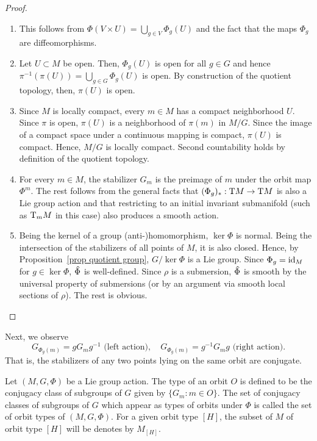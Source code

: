 \begin{proof}
    \begin{enumerate}
        \item This follows from $\Phi(V\times U)=\bigcup_{g\in V}\Phi_g(U)$ and the fact that the maps $\Phi_g$ are diffeomorphisms.
        \item Let $U\subset M$ be open. Then, $\Phi_g(U)$ is open for all $g\in G$ and hence $\pi^{-1}(\pi(U))=\bigcup_{g\in G}\Phi_g(U)$ is open. By construction of the quotient topology, then, $\pi(U)$ is open.
        \item Since $M$ is locally compact, every $m\in M$ has a compact neighborhood $U$. Since $\pi$ is open, $\pi(U)$ is a neighborhood of $\pi(m)$ in $M\slash G$. Since the image of a compact space under a continuous mapping is compact, $\pi(U)$ is compact. Hence, $M\slash G$ is locally compact. Second countability holds by definition of the quotient topology.
        \item For every $m\in M$, the stabilizer $G_m$ is the preimage of $m$ under the orbit map $\Phi^m$. The rest follows from the general facts that $(\Phi_g)_{\ast}:\mathrm{T} M\to \mathrm{T} M$ is also a Lie group action and that restricting to an initial invariant submanifold (such as $\mathrm{T}_mM$ in this case) also produces a smooth action.
        \item Being the kernel of a group (anti-)homomorphism, $\ker\Phi$ is normal. Being the intersection of the stabilizers of all points of $M$, it is also closed. Hence, by Proposition~\ref{prop quotient group}, $G\slash \ker\Phi$ is a Lie group. Since $\Phi_g=\operatorname{id}_M$ for $g\in\ker\Phi$, $\wh{\Phi}$ is well-defined. Since $\rho$ is a submersion, $\wh{\Phi}$ is smooth by the universal property of submersions (or by an argument via smooth local sections of $\rho$). The rest is obvious.
    \end{enumerate}
\end{proof}

Next, we observe
\[G_{\Phi_g(m)}=gG_mg^{-1}\text{ (left action)}, \quad G_{\Phi_g(m)}=g^{-1}G_mg\text{ (right action)}.\]
That is, the stabilizers of any two points lying on the same orbit are conjugate.


\begin{defn}
    Let $(M,G,\Phi)$ be a Lie group action. The type of an orbit $O$ is defined to be the conjugacy class of subgroups of $G$ given by $\{G_m:m\in O\}$. The set of conjugacy classes of subgroups of $G$ which appear as types of orbits under $\Phi$ is called the set of orbit types of $(M,G,\Phi)$. For a given orbit type $[H]$, the subset of $M$ of orbit type $[H]$ will be denotes by $M_{[H]}$.
\end{defn}


